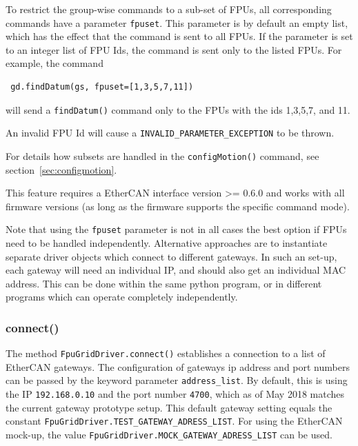\documentclass[11pt,a4paper]{scrartcl}
\begin{document}
To restrict the group-wise commands to a sub-set of FPUs, all
corresponding commands have a parameter \texttt{fpuset}.  This
parameter is by default an empty list, which has the effect that the
command is sent to all FPUs. If the parameter is set to an integer
list of FPU Ids, the command is sent only to the listed FPUs.
For example, the command

\begin{verbatim}
 gd.findDatum(gs, fpuset=[1,3,5,7,11])
\end{verbatim}
will send a \texttt{findDatum()} command only to the FPUs with the ids
1,3,5,7, and 11.

An invalid FPU Id will cause a \texttt{INVALID\_PARAMETER\_EXCEPTION}
to be thrown.

For details how subsets are handled in the \texttt{configMotion()}
command, see section~\ref{sec:configmotion}.

This feature requires a EtherCAN interface version >= 0.6.0 and works with all
firmware versions (as long as the firmware supports the specific
command mode).

Note that using the \texttt{fpuset} parameter is not in all cases the
best option if FPUs need to be handled independently. Alternative
approaches are to instantiate separate driver objects which connect to
different gateways. In such an set-up, each gateway will need an
individual IP, and should also get an individual MAC address. This can
be done within the same python program, or in different programs which
can operate completely independently.


\subsubsection{connect()}
\label{sec:connect}
     The method
\texttt{FpuGridDriver.connect()} establishes a connection to a list of
EtherCAN gateways. The configuration of gateways ip address and port
numbers can be passed by the keyword parameter
\texttt{address\_list}. By default, this is using the IP
\texttt{192.168.0.10} and the port number \texttt{4700}, which as of
May 2018 matches the current gateway prototype setup. This default
gateway setting equals the constant
\texttt{FpuGridDriver.TEST\_GATEWAY\_ADRESS\_LIST}.  For using the
EtherCAN mock-up, the value
\texttt{FpuGridDriver.MOCK\_GATEWAY\_ADRESS\_LIST} can be used.
\end{document}
